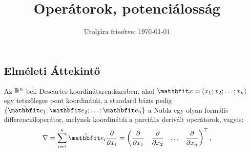 \documentclass{szb-practice}
\title{Operátorok, potenciálosság}
\date{Utoljára frissítve: \today}
\begin{document}
\maketitle

\vspace{-1em}
\subsection{Elméleti Áttekintő}
\vspace{1em}

\begin{definition}
  Az $\mathbb{R}^n$-beli Descartes-koordinátarendszerben, ahol $\rvec x = (x_1;
    x_2; \dots; x_n)$ egy tetszőleges pont koordinátái, a standard bázis pedig
  $\{ \uvec e_1; \uvec e_2; \dots; \uvec e_n \}$ a Nabla egy olyan formális
  differenciáloperátor, melynek koordinátái a parciális derivált operátorok,
  vagyis:
  $$
    \nabla = \sum_{i = 1}^n \uvec e_i \pdv{}{x_i}
    =
    \begin{pmatrix}
      \displaystyle\pdv{}{x_1} &
      \displaystyle\pdv{}{x_2} &
      \hdots                   &
      \displaystyle\pdv{}{x_n}
    \end{pmatrix}^\T
    \text,
  $$
\end{definition}
\end{document}
